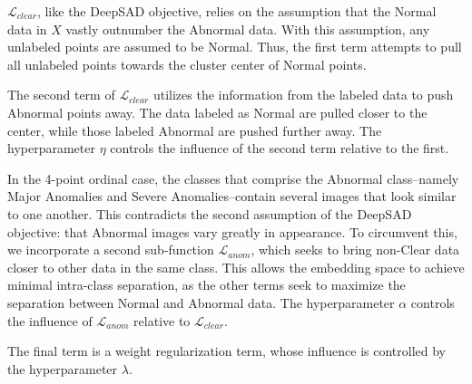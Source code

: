 \documentclass[remotesensing,article,submit,moreauthors]{Definitions/mdpi}
\begin{document}
$\mathcal{L}_{clear}$, like the \ac{DeepSAD} objective, relies on the assumption that the Normal data in $X$ vastly outnumber the Abnormal data. With this assumption, any unlabeled points are assumed to be Normal. Thus, the first term attempts to pull all unlabeled points towards the cluster center of Normal points.  

The second term of $\mathcal{L}_{clear}$ utilizes the information from the labeled data to push Abnormal points away. The data labeled as Normal are pulled closer to the center, while those labeled Abnormal are pushed further away. The hyperparameter $\eta$ controls the influence of the second term relative to the first.

In the 4-point ordinal case, the classes that comprise the Abnormal class--namely Major Anomalies and Severe Anomalies--contain several images that look similar to one another. This contradicts the second assumption of the \ac{DeepSAD} objective: that Abnormal images vary greatly in appearance. To circumvent this, we incorporate a second sub-function $\mathcal{L}_{anom}$, which seeks to bring non-Clear data closer to other data in the same class. This allows the embedding space to achieve minimal intra-class separation, as the other terms seek to maximize the separation between Normal and Abnormal data. The hyperparameter $\alpha$ controls the influence of $\mathcal{L}_{anom}$ relative to $\mathcal{L}_{clear}$. 

The final term is a weight regularization term, whose influence is controlled by the hyperparameter $\lambda$.
\end{document}
